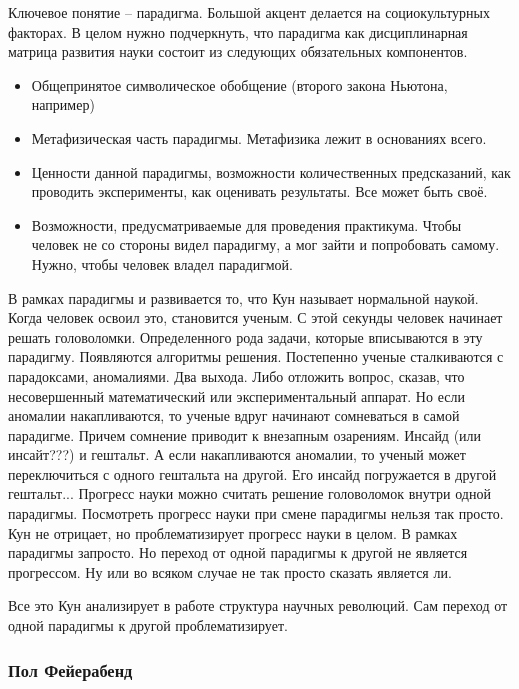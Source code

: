 \documentclass[a4paper, 12pt]{article}
\begin{document}
Ключевое понятие -- парадигма. Большой акцент делается на 
социокультурных факторах. В целом нужно подчеркнуть, что парадигма как 
дисциплинарная матрица развития науки состоит из следующих обязательных 
компонентов.
\begin{itemize}
  \item Общепринятое символическое обобщение (второго закона Ньютона, 
    например)
  \item Метафизическая часть парадигмы. Метафизика лежит в основаниях 
    всего.
  \item Ценности данной парадигмы, возможности количественных 
    предсказаний, как проводить эксперименты, как оценивать результаты. 
    Все может быть своё.
  \item Возможности, предусматриваемые для проведения практикума. Чтобы 
    человек не со стороны видел парадигму, а мог зайти и попробовать 
    самому. Нужно, чтобы человек владел парадигмой.
\end{itemize}
В рамках парадигмы и развивается то, что Кун называет нормальной наукой. 
Когда человек освоил это, становится ученым. С этой секунды человек 
начинает решать головоломки. Определенного рода задачи, которые 
вписываются в эту парадигму. Появляются алгоритмы решения. Постепенно 
ученые сталкиваются с парадоксами, аномалиями. Два выхода. Либо отложить 
вопрос, сказав, что несовершенный математический или экспериментальный 
аппарат. Но если аномалии накапливаются, то ученые вдруг начинают 
сомневаться в самой парадигме. Причем сомнение приводит к внезапным 
озарениям. Инсайд (или инсайт???) и гештальт. А если накапливаются 
аномалии, то ученый может переключиться с одного гештальта на другой. 
Его инсайд погружается в другой гештальт... Прогресс науки можно считать 
решение головоломок внутри одной парадигмы. Посмотреть прогресс науки 
при смене парадигмы нельзя так просто. Кун не отрицает, но 
проблематизирует прогресс науки в целом. В рамках парадигмы запросто. Но 
переход от одной парадигмы к другой не является прогрессом. Ну или во 
всяком случае не так просто сказать является ли.

Все это Кун анализирует в работе структура научных революций. Сам 
переход от одной парадигмы к другой проблематизирует.

\subsubsection{Пол Фейерабенд}
\end{document}
